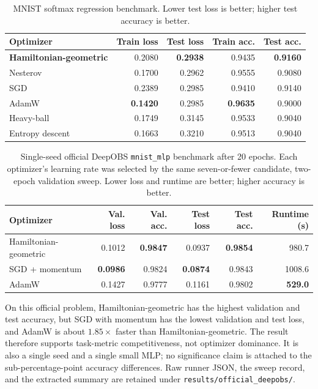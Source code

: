 \documentclass[10pt,twocolumn]{article}
\begin{document}
\begin{table}[t]
\centering
\caption{MNIST softmax regression benchmark. Lower test loss is better; higher
test accuracy is better.}
\label{tab:mnist}
\begin{tabular}{@{}lrrrr@{}}
\toprule
Optimizer & Train loss & Test loss & Train acc. & Test acc. \\
\midrule
\textbf{Hamiltonian-geometric} & 0.2080 & \textbf{0.2938} & 0.9435 & \textbf{0.9160} \\
Nesterov & 0.1700 & 0.2962 & 0.9555 & 0.9080 \\
SGD & 0.2389 & 0.2985 & 0.9410 & 0.9140 \\
AdamW & \textbf{0.1420} & 0.2985 & \textbf{0.9635} & 0.9000 \\
Heavy-ball & 0.1749 & 0.3145 & 0.9533 & 0.9040 \\
Entropy descent & 0.1663 & 0.3210 & 0.9513 & 0.9040 \\
\bottomrule
\end{tabular}
\end{table}

\begin{table}[t]
\centering
\caption{Single-seed official DeepOBS \texttt{mnist\_mlp} benchmark after 20
epochs. Each optimizer's learning rate was selected by the same seven-or-fewer
candidate, two-epoch validation sweep. Lower loss and runtime are better;
higher accuracy is better.}
\label{tab:deepobs-official}
\begin{tabular}{@{}lrrrrr@{}}
\toprule
Optimizer & Val. loss & Val. acc. & Test loss & Test acc. & Runtime (s) \\
\midrule
Hamiltonian-geometric & 0.1012 & \textbf{0.9847} & 0.0937 & \textbf{0.9854} & 980.7 \\
SGD + momentum & \textbf{0.0986} & 0.9824 & \textbf{0.0874} & 0.9843 & 1008.6 \\
AdamW & 0.1427 & 0.9777 & 0.1161 & 0.9802 & \textbf{529.0} \\
\bottomrule
\end{tabular}
\end{table}

On this official problem, Hamiltonian-geometric has the highest validation and
test accuracy, but SGD with momentum has the lowest validation and test loss,
and AdamW is about $1.85\times$ faster than Hamiltonian-geometric. The result
therefore supports task-metric competitiveness, not optimizer dominance. It is
also a single seed and a single small MLP; no significance claim is attached
to the sub-percentage-point accuracy differences. Raw runner JSON, the sweep
record, and the extracted summary are retained under
\texttt{results/official\_deepobs/}.
\end{document}

